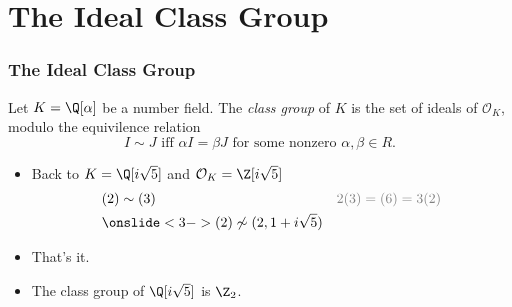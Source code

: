 \section{The Ideal Class Group}

\begin{frame}
	\frametitle{The Ideal Class Group}

	\begin{definition}
		Let $K = \Q[\alpha]$ be a number field. The \textit{class group} of $K$ is the set of ideals of $\mathcal O_K$, modulo the equivilence relation
		\begin{equation*}
			I \sim J \text{ iff } \alpha I = \beta J \text{ for some nonzero } \alpha, \beta \in R.
		\end{equation*}
	\end{definition}


	\medskip

	\begin{itemize}

		\item<2-> Back to $K = \Q[i \sqrt 5]$ and $\mathcal O_K = \Z[i \sqrt 5]$
			\begin{align*}
				 & (2) \sim (3)                                  & {\tiny \color{gray} 2 (3) = (6) = 3 (2)} \\
				 & \onslide<3->{(2) \not \sim (2, 1 + i \sqrt5)}
			\end{align*}
		\item<4-> That's it.
		\item<5-> The class group of $\Q[i \sqrt 5]$ is $\Z_2$.
	\end{itemize}
\end{frame}

